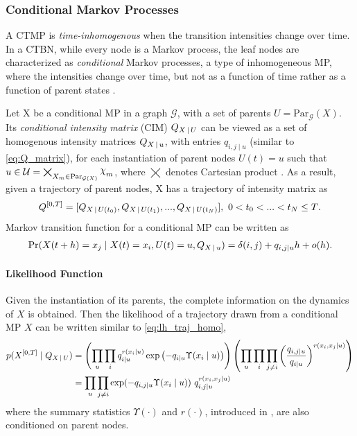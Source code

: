 \subsubsection{Conditional Markov Processes}
A CTMP is \textit{time-inhomogenous} when the transition intensities change over time. In a CTBN, while every node is a Markov process, the leaf nodes are characterized as \textit{conditional} Markov processes, a type of inhomogeneous MP, where the intensities change over time, but not as a function of time rather as a function of parent states \cite{Nodelman1995}. \par
Let X be a conditional MP in a graph $ \mathcal{G} $, with a set of parents $ U = \mathrm{Par}_{\mathcal{G}}(X)$. Its \textit{conditional intensity matrix} (CIM) $ Q_{X\,|\, U} $ can be viewed as a set of homogenous intensity matrices $ Q_{X\,|\, u} $, with entries $ q_{i,j \mid u} $ (similar to \autoref{eq:Q_matrix}), for each instantiation of parent nodes $ U(t) =u $ such that $ u \in \mathcal{U} = \bigtimes_{X_m \in \mathrm{Par}_{\mathcal{G}(X)}} \rchi_m $, where $ \bigtimes $ denotes Cartesian product \cite{Nodelman1995}. As a result, given a trajectory of parent nodes, X has a trajectory of intensity matrix as
\begin{equation}
Q^{[0,T]} = [Q_{X\,|\, U(t_0)}, Q_{X\,|\, U(t_1)}, ..., Q_{X\,|\, U(t_N)}],\ 0<t_0<...<t_N\leq T\text{.}
\end{equation}
Markov transition function for a conditional MP can be written as
\begin{align}
\operatorname{Pr}(X(t + h) = x_j \mid X(t)=x_i, U(t)=u, Q_{X\,|\, u}) = \delta(i,j) + q_{i,j \mid u} h + o(h).
\label{eq:CIM_trans_funct}
\end{align}

\paragraph*{Likelihood Function}
Given the instantiation of its parents, the complete information on the dynamics of $ X $ is obtained. Then the likelihood of a trajectory drawn from a conditional MP $ X $ can be written similar to \autoref{eq:lh_traj_homo},
\begin{align}
p(X^{[0,T]}  \mid Q_{X\,|\, U}) &=  \left(\prod_{ u}\prod_{ i} q_{i\mid u}^{r(x_{i}\mid u)} \exp \left(-q_{i\mid u} \Upsilon(x_{i}\mid u)\right)\right)\left(\prod_{ u}\prod_{ i} \prod_{ j \neq i} \left(\frac{q_{i,j\mid u}}{q_{i\mid u}}\right)^{r(x_{i}, x_{j}\mid u)}\right) \nonumber\\ & = \prod_{ u}\prod_{j\neq i}  \exp(-q_{i,j\mid u}\Upsilon(x_{i}\mid u)) \ q_{i,j\mid u}^{r(x_{i},x_{j}\mid u)}
\label{eq:lh_traj_cond}
\end{align}
where the summary statistics $ \Upsilon(\cdot) $ and $ r(\cdot) $, introduced in  , are also conditioned on parent nodes.
